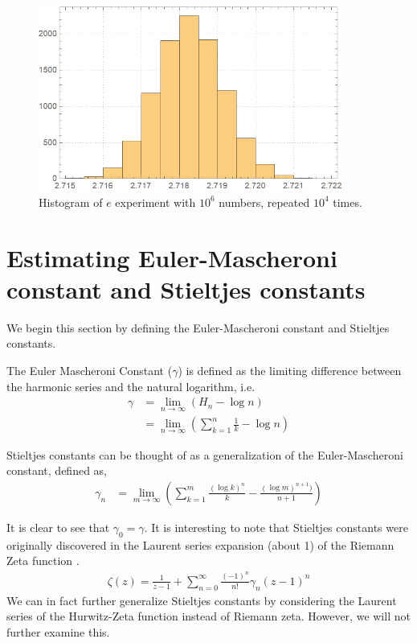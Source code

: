 \documentclass[12pt]{article}
\numberwithin{equation}{section}
\begin{document}
\begin{figure}[!htb]
    \centering
    \includegraphics[width=10cm]{Images/repeatede.png}
    \caption{Histogram of $e$ experiment with $10^6$ numbers, repeated $10^4$ times.}
    \label{fig:repeatede}
\end{figure}
\section{Estimating Euler-Mascheroni constant and Stieltjes constants}
We begin this section by defining the Euler-Mascheroni constant and Stieltjes constants.
\par The Euler Mascheroni Constant ($\gamma$) is defined as the limiting difference between the harmonic series and the natural logarithm, i.e.
\begin{align}
    \gamma &= \lim_{n \rightarrow \infty} \left( H_n - \log n \right)\\ \label{emconstant}
    &= \lim_{n \rightarrow \infty} \left(\sum_{k=1}^{n} \frac{1}{k} - \log n \right) \nonumber
\end{align}
\par Stieltjes constants can be thought of as a generalization of the Euler-Mascheroni constant, defined as,
\begin{align}
    \gamma_n &= \lim_{m \rightarrow \infty} \left( \sum_{k=1}^m \frac{(\log k)^n}{k} - \frac{(\log m)^{n+1})}{n+1} \right)
\end{align}
\par It is clear to see that $\gamma_0=\gamma$. It is interesting to note that Stieltjes constants were originally discovered in the Laurent series expansion (about 1) of the Riemann Zeta function \cite{stieltjeswolfram}.
\begin{align*}
    \zeta (z) = \frac{1}{z-1} + \sum_{n=0}^\infty \frac{(-1)^n }{n!} \gamma_n (z-1)^n
\end{align*}
We can in fact further generalize Stieltjes constants by considering the Laurent series of the Hurwitz-Zeta function instead of Riemann zeta. However, we will not further examine this.
\end{document}
